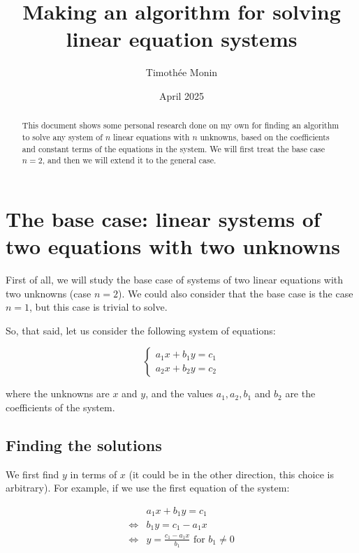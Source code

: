 \documentclass[11pt]{article}
\title{Making an algorithm for solving linear equation systems}
\author{Timothée Monin}
\date{April 2025}
\begin{document}
\maketitle

\begin{abstract}
This document shows some personal research done on my own for finding an algorithm
to solve any system of $n$ linear equations with $n$ unknowns,
based on the coefficients and constant terms of the equations in the system.
We will first treat the base case $n = 2$, and then we will extend it to the general case.
\end{abstract}

\tableofcontents

\pagebreak

\section{The base case: linear systems of two equations with two unknowns}

First of all, we will study the base case of systems of two linear equations with two unknowns (case $n = 2$).
We could also consider that the base case is the case $n = 1$, but
this case is trivial to solve.

So, that said, let us consider the following system of equations:

\[
\begin{cases}
    a_1 x + b_1 y = c_1 \\
    a_2 x + b_2 y = c_2
\end{cases}
\]

where the unknowns are $x$ and $y$, and the values $a_1, a_2, b_1$ and $b_2$ are the coefficients of the system.

\subsection{Finding the solutions}

We first find $y$ in terms of $x$ (it could be in the other direction, this choice is arbitrary).
For example, if we use the first equation of the system:


\begin{align*}
    &a_1 x + b_1 y = c_1 \\
    \iff &b_1 y = c_1 - a_1 x \\
    \iff &y = \frac{c_1 - a_1 x}{b_1} \text{ for } b_1 \neq 0\\
\end{align*}
\end{document}
